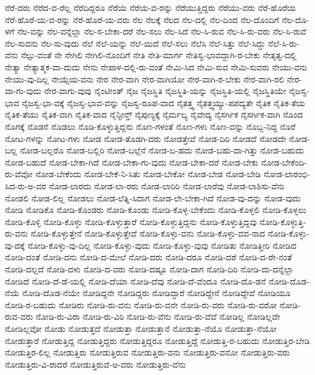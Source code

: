 {ನೆರೆ-ದರು
ನೆರೆದ-ವ-ರೆಲ್ಲ
ನೆರೆದಿದ್ದರೂ
ನೆರೆಯ
ನೆರೆಯ-ವ-ರನ್ನು
ನೆರೆಯುತ್ತಿದ್ದರು
ನೆರೆಯು-ವರು
ನೆರೆ-ಹೊರೆಯ
ನೆರೆ-ಹೊರೆ-ಯ-ವ-ರನ್ನು
ನೆರೆ-ಹೊರೆ-ಯ-ವರು
ನೆಲ
ನೆಲಕ್ಕೆ
ನೆಲದ
ನೆಲ-ದಲ್ಲಿ
ನೆಲ-ದಿಂದ
ನೆಲ-ದೊಂದಿಗೆ
ನೆಲ-ದೊ-ಳಗೆ
ನೆಲ-ವನ್ನು
ನೆಲ-ವನ್ನೆಲ್ಲಾ
ನೆಲ-ಸ-ಬೇಕಾ-ದರೆ
ನೆಲ-ಸಲು
ನೆಲ-ಸಿದೆ
ನೆಲ-ಸಿ-ರುವ
ನೆಲ-ಸಿ-ರು-ವರು
ನೆಲ-ಸಿ-ರುವೆ
ನೆಲ-ಸುವನು
ನೆಲ-ಸು-ವುದು
ನೆಲೆ
ನೆಲೆ-ಯನ್ನು
ನೆಲೆ-ಯಿದೆ
ನೆಲೆ-ಸಲು
ನೆಲೆಸಿ
ನೆಲೆ-ಸಿತ್ತು
ನೆಲೆ-ಸಿದ್ದು
ನೆಲೆ-ಸಿ-ರು-ವೆನು
ನೆಲ್ಸು-ವಂತೆ
ನೇ
ನೇಗಿಲಿ
ನೇಗಿಲಿ-ನೊಂದಿಗೆ
ನೇತಿ
ನೇತಿ-ಮಾರ್ಗ
ನೇತಿಸ್ವ-ಭಾವದ್ದಾಗಿ-ರ-ಬೇಕು
ನೇತೃತ್ವ-ದಲ್ಲಿ
ನೇತ್ಯಾ
ನೇತ್ಯಾತ್ಮಕ-ವಾ-ದುದು
ನೇನು
ನೇಪಾಳ-ದಲ್ಲಿ-ರು-ವಂತೆ
ನೇಮಿ-ಸಿದ
ನೇಮಿ-ಸುವ
ನೇಮಿ-ಸುವರು
ನೇಯು-ವನು
ನೇಯು-ವು-ದಿಲ್ಲ
ನೇಯ್ಗೆಯ-ವನು
ನೇರ
ನೇರ-ವಾಗಿ
ನೇರ-ವಾಗಿಯೋ
ನೇರ-ವಾಗಿ-ರ-ಬೇಕು
ನೇರ-ವಾಗಿ-ರಲಿ
ನೇರ-ವಾ-ಗು-ವುದು
ನೇರ-ವಾಗು-ವುವು
ನೈಂಟೀಂತ್
ನೈಜ
ನೈಜಸ್ಥಿತಿ
ನೈಜಸ್ಥಿತಿ-ಯನ್ನು
ನೈಜಸ್ಥಿತಿ-ಯಲ್ಲಿ
ನೈಜಸ್ಥಿತಿಯೇ
ನೈಜಸ್ವ-ಭಾವ
ನೈಜಸ್ವ-ಭಾ-ವಕ್ಕೆ
ನೈಜಸ್ವ-ಭಾವ-ವನ್ನು
ನೈಜಸ್ವ-ರೂಪ-ವಾದ
ನೈತತ್ತ್ವ
ನೈತತ್ತ್ವಯ್ಯು-ಪಪದ್ಯತೇ
ನೈತಿಕ
ನೈತಿಕ-ತೆಯ
ನೈತಿಕ-ತೆಯು
ನೈತಿಕ-ವಾಗಿ
ನೈತಿಕ-ವಾದ
ನೈನ್ಟೀನ್ತ್
ನೈಪುಣ್ಯಕ್ಕೆ
ನೈರ್ಮಲ್ಯ
ನೈವೇದ್ಯ
ನೈಸರ್ಗಿಕ
ನೈಸರ್ಗಿಕ-ವಾಗಿ
ನೊಂದ
ನೊಗಕ್ಕೆ
ನೊಡನೆ
ನೊಡಲು
ನೊಡಿ-ಕೊಳ್ಳುತ್ತಿದ್ದನು
ನೊಣ-ಗಳಂತೆ
ನೊಣ-ಗಳು
ನೊಣ-ವನ್ನು
ನೊಬ್ಬ-ನಿದ್ದ
ನೊರೆ
ನೋಟ-ಗಳನ್ನು
ನೋಟ-ಗಳು
ನೋಡ
ನೋಡ-ತೊಡಗಿ-ದರು
ನೋಡತ್ತೇವೆ
ನೋಡ-ದಿರಿ
ನೋಡದೆ
ನೋಡದೇ
ನೋಡ-ಬಲ್ಲ
ನೋಡ-ಬಲ್ಲರೊ
ನೋಡ-ಬಲ್ಲಿರಿ
ನೋಡ-ಬಲ್ಲೆನೆ
ನೋಡ-ಬ-ಹದು
ನೋಡ-ಬಹು-ದಾ-ಗಿತ್ತು
ನೋಡ-ಬಹುದು
ನೋಡ-ಬಹುದೆ
ನೋಡ-ಬೇಕಾ-ಗಿದೆ
ನೋಡ-ಬೇಕಾ-ಗು-ವುದು
ನೋಡ-ಬೇಕಾ-ದರೆ
ನೋಡ-ಬೇಕು
ನೋಡ-ಬೇಕೆಂದಿ-ರು-ವೆವೋ
ನೋಡ-ಬೇಕೆಂದು
ನೋಡ-ಬೇಕೆ-ನಿ-ಸಿತು
ನೋಡ-ಬೇಕೋ
ನೋಡ-ಬೇಡ
ನೋಡ-ಬೇಡಿ
ನೋಡ-ಲಾರಂಭಿ-ಸಿದ-ರು-ಅ-ವರ
ನೋಡ-ಲಾರದು
ನೋಡ-ಲಾ-ರರು
ನೋಡ-ಲಾರಿರಿ
ನೋಡ-ಲಾರೆವು
ನೋಡ-ಲಾಶಿಸು-ವೆನು
ನೋಡಲಿ
ನೋಡ-ಲಿಲ್ಲ
ನೋಡಲು
ನೋಡ-ಲೆತ್ನಿ-ಸಿದಾಗ
ನೋಡ-ಲೇ-ಬೇಕಾ-ಗಿದೆ
ನೋಡ-ವು-ದನ್ನು
ನೋಡ-ವುದು
ನೋಡಿ
ನೋಡಿಕೊ
ನೋಡಿ-ಕೊಂಡರು
ನೋಡಿ-ಕೊಂಡು
ನೋಡಿ-ಕೊಳ್ಳ-ಬೇಕೆಂದು
ನೋಡಿ-ಕೊಳ್ಳಲಿ
ನೋಡಿ-ಕೊಳ್ಳಲು
ನೋಡಿ-ಕೊಳ್ಳಿ
ನೋಡಿ-ಕೊಳ್ಳು
ನೋಡಿ-ಕೊಳ್ಳುತ್ತಾರೆ
ನೋಡಿ-ಕೊಳ್ಳುತ್ತಿದ್ದನು
ನೋಡಿ-ಕೊಳ್ಳುತ್ತಿದ್ದವು
ನೋಡಿ-ಕೊಳ್ಳುತ್ತಿ-ರು-ವನು
ನೋಡಿ-ಕೊಳ್ಳುತ್ತೇನೆ
ನೋಡಿ-ಕೊಳ್ಳುತ್ತೇವೆ
ನೋಡಿ-ಕೊಳ್ಳು-ವನು
ನೋಡಿ-ಕೊಳ್ಳು-ವವ-ನಾದ
ನೋಡಿ-ಕೊಳ್ಳು-ವು-ದಕ್ಕೆ
ನೋಡಿ-ಕೊಳ್ಳು-ವು-ದಿಲ್ಲ
ನೋಡಿ-ಕೊಳ್ಳು-ವುದು
ನೋಡಿ-ಕೊಳ್ಳು-ವುವು
ನೋಡಿತು
ನೋಡಿತ್ತೀರಿ
ನೋಡಿದ
ನೋಡಿ-ದಂತೆ
ನೋಡಿ-ದನು
ನೋಡಿ-ದ-ಮೇಲೆ
ನೋಡಿ-ದರು
ನೋಡಿ-ದರೂ
ನೋಡಿ-ದರೆ
ನೋಡಿ-ದ-ರೇ-ನಂತೆ
ನೋಡಿ-ದಲ್ಲದೆ
ನೋಡಿ-ದಳು
ನೋಡಿ-ದ-ವರು
ನೋಡಿ-ದಷ್ಟೂ
ನೋಡಿ-ದಾಗ
ನೋಡಿ-ದಿರಿ
ನೋಡಿ-ದು-ದನ್ನೆಲ್ಲಾ
ನೋಡಿದೆ
ನೋಡಿ-ದೆ-ಡೆ-ಯಲ್ಲಿ
ನೋಡಿ-ದೆಯಾ
ನೋಡಿ-ದೆವು
ನೋಡಿ-ದೆ-ವೆಂದೂ
ನೋಡಿ-ದೊ-ಡನೆ
ನೋಡಿ-ದೊಡ-ನೆಯೆ
ನೋಡಿ-ದೊಡ-ನೆಯೇ
ನೋಡಿದ್ದನೇ
ನೋಡಿದ್ದರು
ನೋಡಿದ್ದಾರೆ
ನೋಡಿದ್ದೇನೆ
ನೋಡಿದ್ದೇವೆ
ನೋಡಿಯೂ
ನೋಡಿ-ರ-ಬಹುದು
ನೋಡಿರು
ನೋಡಿ-ರು-ವನು
ನೋಡಿ-ರು-ವನೇ
ನೋಡಿ-ರು-ವರು
ನೋಡಿ-ರು-ವರೋ
ನೋಡಿ-ರುವ-ವರು
ನೋಡಿ-ರು-ವಿರಾ
ನೋಡಿ-ರು-ವಿರಿ
ನೋಡಿ-ರು-ವೆನು
ನೋಡಿ-ರು-ವೆವೆ
ನೋಡಿಲ್ಲ
ನೋಡಿಲ್ಲವೇ
ನೋಡಿಲ್ಲವೋ
ನೋಡು
ನೋಡುತ್ತದೆ
ನೋಡುತ್ತಾ
ನೋಡುತ್ತಾನೆ
ನೋಡುತ್ತಾ-ನೆಯೊ
ನೋಡುತ್ತಾ-ನೆಯೋ
ನೋಡುತ್ತಾರೆ
ನೋಡುತ್ತಿದ್ದ
ನೋಡುತ್ತಿದ್ದರು
ನೋಡುತ್ತಿದ್ದರೂ
ನೋಡುತ್ತಿದ್ದೆ
ನೋಡುತ್ತಿ-ರ-ಬಹುದು
ನೋಡುತ್ತಿರ-ಬೇಡಿ
ನೋಡುತ್ತಿರ-ಲಿಲ್ಲ
ನೋಡುತ್ತಿರು
ನೋಡುತ್ತಿರುವ
ನೋಡುತ್ತಿರು-ವನು
ನೋಡುತ್ತಿರು-ವನೋ
ನೋಡುತ್ತಿರು-ವರು
ನೋಡುತ್ತಿರು-ವಿ-ರಾದರೆ
ನೋಡುತ್ತಿರುವೆ-ಅ-ವರು
ನೋಡುತ್ತಿರು-ವೆನು
}
